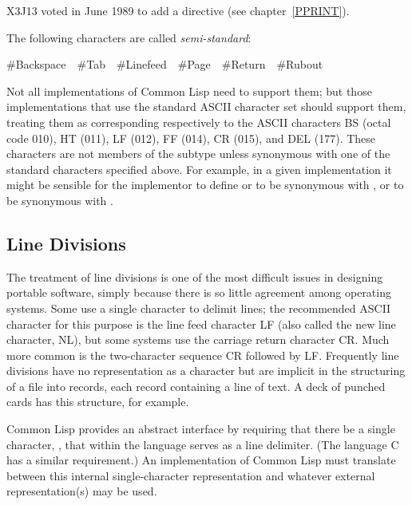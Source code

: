 {\begin{newer}
X3J13 voted in June 1989 
to add a  directive \cd{{\Xtilde}{\Xunderscore}} (see chapter~\ref{PPRINT}).
\end{newer}

The following characters are called {\it semi-standard}:
\begin{lisp}
\#{\Xbackslash}Backspace~~\#{\Xbackslash}Tab~~\#{\Xbackslash}Linefeed~~\#{\Xbackslash}Page~~\#{\Xbackslash}Return~~\#{\Xbackslash}Rubout
\end{lisp}
Not all implementations of Common Lisp need to support them; but those
implementations that
use the standard ASCII character set should support them, treating them as
corresponding respectively to the ASCII characters BS (octal code 010),
HT (011), LF (012), FF (014), CR (015), and DEL
(177). These characters are not
members of the subtype  unless synonymous with
one of the standard characters specified above.
For example, in a given implementation it might
be sensible for the implementor to define
 or  to be synonymous with ,
or  to be synonymous with .

\subsection{Line Divisions}

The treatment of line divisions is one of the most difficult issues
in designing portable software, simply because there is so little agreement
among operating systems.  Some use a single character to delimit lines;
the recommended ASCII character for this purpose is the line feed character
LF (also called the new line character, NL),
but some systems use the carriage
return character CR.  Much more common is the two-character sequence
CR followed by LF.  Frequently line divisions have no representation
as a character but are implicit in the structuring of a file into records,
each record containing a line of text.  A deck of punched cards has this
structure, for example.

Common Lisp provides an abstract interface by requiring that there be a single
character, , that within the language serves as a line
delimiter.  (The language C has a similar requirement.)
An implementation of Common Lisp must translate between this internal
single-character representation and whatever external representation(s)
may be used.

}
